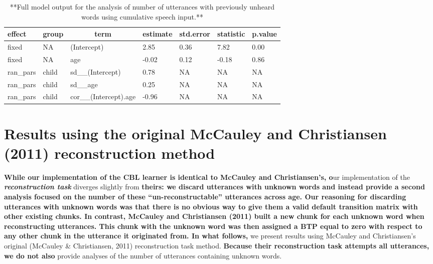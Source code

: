 \documentclass[man,mask,floatsintext]{apa6}
\begin{document}
\begin{table}[tbp]
\begin{center}
\begin{threeparttable}
\caption{\label{tab:tab-unseen_words-cumu-MAIN}**Full model output for the analysis of number of utterances with previously unheard words using cumulative speech input.**}
\begin{tabular}{lllllll}
\toprule
effect & \multicolumn{1}{c}{group} & \multicolumn{1}{c}{term} & \multicolumn{1}{c}{estimate} & \multicolumn{1}{c}{std.error} & \multicolumn{1}{c}{statistic} & \multicolumn{1}{c}{p.value}\\
\midrule
fixed & NA & (Intercept) & 2.85 & 0.36 & 7.82 & 0.00\\
fixed & NA & age & -0.02 & 0.12 & -0.18 & 0.86\\
ran\_pars & child & sd\_\_(Intercept) & 0.78 & NA & NA & NA\\
ran\_pars & child & sd\_\_age & 0.25 & NA & NA & NA\\
ran\_pars & child & cor\_\_(Intercept).age & -0.96 & NA & NA & NA\\
\bottomrule
\end{tabular}
\end{threeparttable}
\end{center}
\end{table}

\pagebreak

\section{Results using the original McCauley and Christiansen (2011)
reconstruction
method}\label{results-using-the-original-mccauley-and-christiansen-2011-reconstruction-method}

\textbf{While our implementation of the CBL learner is identical to
McCauley and Christiansen's, o}ur implementation of the
\textbf{\emph{reconstruction task}} diverges slightly from
\textbf{theirs: we discard utterances with unknown words and instead
provide a second analysis focused on the number of these
\enquote{un-reconstructable} utterances across age. Our reasoning for
discarding utterances with unknown words was that there is no obvious
way to give them a valid default transition matrix with other existing
chunks. In contrast, McCauley and Christiansen (2011) built a new chunk
for each unknown word when reconstructing utterances. This chunk with
the unknown word was then assigned a BTP equal to zero with respect to
any other chunk in the utterance it originated from. In what follows,}
we present results using McCauley and Christiansen's original (McCauley
\& Christiansen, 2011) reconstruction task method. \textbf{Because their
reconstruction task attempts all utterances, we do not also} provide
analyses of the number of utterances containing unknown words.
\end{document}
